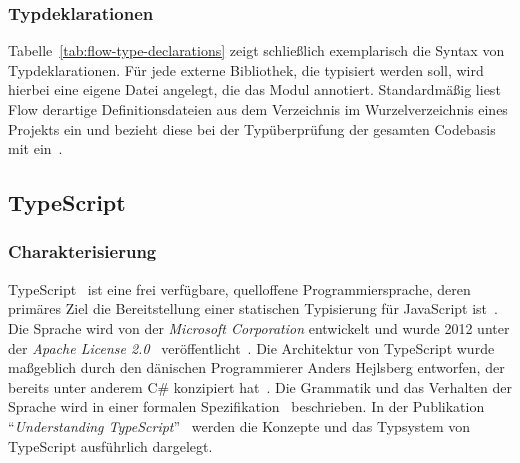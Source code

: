 

\subsubsection{Typdeklarationen}
\label{subsubsec:type-declarations}

Tabelle~\ref{tab:flow-type-declarations} zeigt schließlich exemplarisch die Syntax von Typdeklarationen. Für jede externe Bibliothek, die typisiert werden soll, wird hierbei eine eigene Datei angelegt, die das Modul annotiert. Standardmäßig liest Flow derartige Definitionsdateien aus dem Verzeichnis  im Wurzelverzeichnis eines Projekts ein und bezieht diese bei der Typüberprüfung der gesamten Codebasis mit ein~\autocite{FLOW:LIBRARY_DEFINITIONS}.



\subsection{TypeScript}

\subsubsection{Charakterisierung}

TypeScript~\autocite{TYPESCRIPT:SPEC} ist eine frei verfügbare, quelloffene Programmiersprache, deren primäres Ziel die Bereitstellung einer statischen Typisierung für JavaScript ist~\autocite[2]{BIERMAN:2014}. Die Sprache wird von der \textit{Microsoft Corporation} entwickelt und wurde 2012 unter der \textit{Apache License 2.0}~\autocite{LICENSE:APACHE20} veröffentlicht~\autocite{TYPESCRIPT:GITHUB}. Die Architektur von TypeScript wurde maßgeblich durch den dänischen Programmierer Anders Hejlsberg entworfen, der bereits unter anderem C\# konzipiert hat~\autocite{GITHUB:HEJLSBERG}. Die Grammatik und das Verhalten der Sprache wird in einer formalen Spezifikation~\autocite{TYPESCRIPT:SPEC} beschrieben. In der Publikation \enquote{\textit{Understanding TypeScript}}~\autocite{BIERMAN:2014} werden die Konzepte und das Typsystem von TypeScript ausführlich dargelegt.

